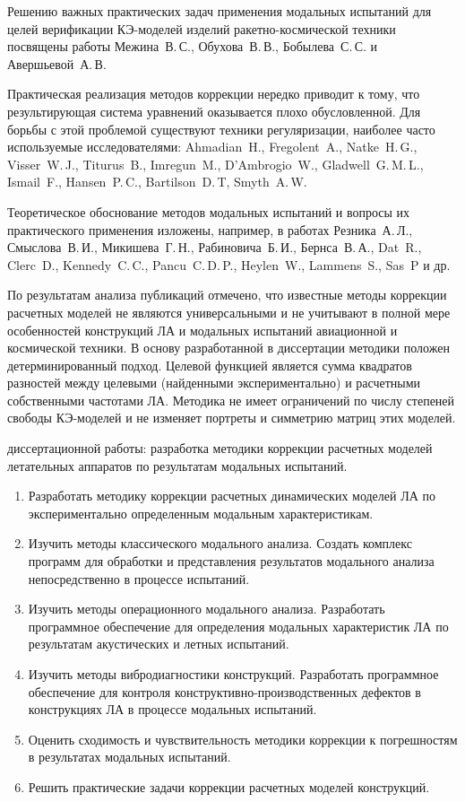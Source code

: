 Решению важных практических задач применения модальных испытаний для целей верификации КЭ-моделей изделий ракетно-космической техники посвящены работы Межина~В.\,С., Обухова~В.\,В., Бобылева~С.\,С. и Авершьевой~А.\,В.

Практическая реализация методов коррекции нередко приводит к тому, что результирующая система уравнений оказывается плохо обусловленной. Для борьбы с этой проблемой существуют техники регуляризации, наиболее часто используемые исследователями: Ahmadian~H., Fregolent~A., Natke~H.\,G., Visser~W.\,J., Titurus~B., Imregun~M., D'Ambrogio~W., Gladwell~G.\,M.\,L., Ismail~F., Hansen~P.\,C., Bartilson~D.\,T, Smyth~A.\,W.

Теоретическое обоснование методов модальных испытаний и вопросы их практического применения изложены, например, в работах Резника~А.\,Л., Смыслова~В.\,И., Микишева~Г.\,Н., Рабиновича~Б.\,И., Бернса~В.\,А., Dat~R., Clerc~D., Kennedy~C.\,C., Pancu~C.\,D.\,P., Heylen~W., Lammens~S., Sas~P и др.

По результатам анализа публикаций отмечено, что известные методы коррекции расчетных моделей не являются универсальными и не учитывают в полной мере особенностей конструкций ЛА и модальных испытаний авиационной и космической техники. В основу разработанной в диссертации методики положен детерминированный подход. Целевой функцией является сумма квадратов разностей между целевыми (найденными экспериментально) и расчетными собственными частотами ЛА. Методика не имеет ограничений по числу степеней свободы КЭ-моделей и не изменяет портреты и симметрию матриц этих моделей.

{\aim} диссертационной работы: разработка методики коррекции расчетных моделей летательных аппаратов по результатам модальных испытаний. 

{\tasks}
\begin{enumerate}[beginpenalty = 10000] 
	\item Разработать методику коррекции расчетных динамических моделей ЛА по экспериментально определенным модальным характеристикам.
	\item Изучить методы классического модального анализа. Создать комплекс программ для обработки и представления результатов модального анализа непосредственно в процессе испытаний.
	\item Изучить методы операционного модального анализа. Разработать программное обеспечение для определения модальных характеристик ЛА по результатам акустических и летных испытаний.
	\item Изучить методы вибродиагностики конструкций. Разработать программное обеспечение для контроля конструктивно-производственных дефектов в конструкциях ЛА в процессе модальных испытаний.
	\item Оценить сходимость и чувствительность методики коррекции к погрешностям в результатах модальных испытаний.
	\item Решить практические задачи коррекции расчетных моделей конструкций.
\end{enumerate}

